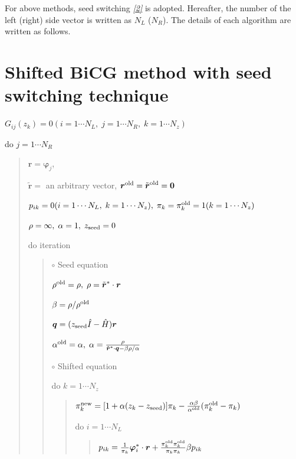 \documentclass[letterpaper,10pt,dvipdfmx,openany]{sphinxmanual}
\begin{document}
For above methods, seed switching {\hyperref[komega_ref_en:ref]{\emph{{[}2{]}}}} is adopted.
Hereafter, the number of the left (right) side vector is
written as \(N_L\) (\(N_R\)).
The details of each algorithm are written as follows.


\section{Shifted BiCG method with seed switching technique}
\label{komega_algorithm_en:shifted-bicg-method-with-seed-switching-technique}
\(G_{i j}(z_k) = 0 (i=1 \cdots N_L,\; j = 1 \cdots N_R,\; k=1 \cdots N_z)\)

do \(j = 1 \cdots N_R\)
\begin{quote}

\({\boldsymbol r} = {\boldsymbol \varphi_j}\),

\({\tilde {\boldsymbol r}} =\) an arbitrary vector,
\({\boldsymbol r}^{\rm old} = {\tilde {\boldsymbol r}}^{\rm old} = {\bf 0}\)

\(p_{i k} = 0(i=1 \cdots N_L,\; k=1 \cdots N_z),\; \pi_k=\pi_k^{\rm old} = 1(k=1 \cdots N_z)\)

\(\rho = \infty,\; \alpha = 1,\; z_{\rm seed}=0\)

do iteration
\begin{quote}

\(\circ\) Seed equation

\(\rho^{\rm old} = \rho,\; \rho = {\tilde {\boldsymbol r}}^* \cdot {\boldsymbol r}\)

\(\beta = \rho / \rho^{\rm old}\)

\({\boldsymbol q} = (z_{\rm seed} {\hat I} - {\hat H}){\boldsymbol r}\)

\(\alpha^{\rm old} = \alpha,\; \alpha = \frac{\rho}{{\tilde {\boldsymbol r}}^*\cdot{\boldsymbol q} - \beta \rho / \alpha }\)

\(\circ\) Shifted equation

do \(k = 1 \cdots N_z\)
\begin{quote}

\(\pi_k^{\rm new} = [1+\alpha(z_k-z_{\rm seed})]\pi_k - \frac{\alpha \beta}{\alpha^{\rm old}}(\pi_k^{\rm old} - \pi_k)\)

do \(i = 1 \cdots N_L\)
\begin{quote}

\(p_{i k} = \frac{1}{\pi_k} {\boldsymbol \varphi}_i^* \cdot {\boldsymbol r} + \frac{\pi^{\rm old}_k \pi^{\rm old}_k}{\pi_k \pi_k} \beta p_{i k}\)


\end{quote}
\end{quote}
\end{quote}
\end{quote}
\end{document}

